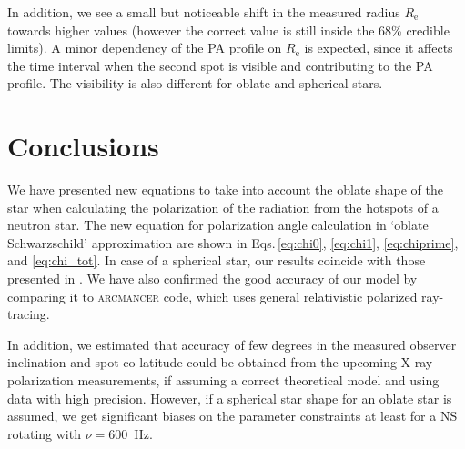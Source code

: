 \documentclass{aa}
\newcommand{\red}[1]{\textcolor{red}{#1}}
\newcommand{\blue}[1]{\textcolor{blue}{#1}}
\newcommand{\req}{R_{\mathrm{e}}}
\begin{document}
In addition, we see a small but noticeable shift in the measured radius $\req$ towards higher values (however the correct value is still inside the 68\% credible limits). 
A minor dependency of the PA profile on $\req$ is expected, since it affects the time interval when the second spot is visible and contributing to the PA profile. 
The visibility is also different for oblate and spherical stars.











\section{Conclusions}\label{sec:conclusions}

We have presented new equations to take into account the oblate shape of the star when calculating the polarization of the radiation from the hotspots of a neutron star.
The new equation for polarization angle calculation in `oblate Schwarzschild' approximation are shown in Eqs.\,\eqref{eq:chi0}, \eqref{eq:chi1}, \eqref{eq:chiprime}, and \eqref{eq:chi_tot}.
In case of a spherical star, our results coincide with those presented in \citet{VP04}.
We have also confirmed the good accuracy of our model by comparing it to \textsc{arcmancer} code, which uses general relativistic polarized ray-tracing.

In addition, we estimated that accuracy of few degrees in the measured observer inclination and spot co-latitude could be obtained from the upcoming X-ray polarization measurements, if assuming a correct theoretical model and using data with high precision.
However, if a spherical star shape for an oblate star is assumed, we get significant biases on the parameter constraints at least for a NS rotating with $\nu = 600$~Hz.
\end{document}
